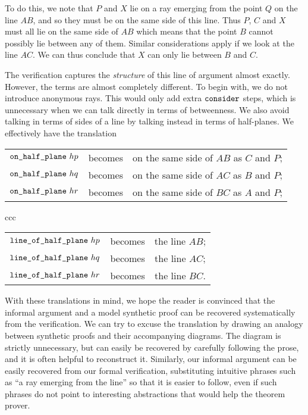 To do this, we note that $P$ and $X$ lie on a ray emerging from the point $Q$ on the line $AB$, and so they must be on the same side of this line. Thus $P$, $C$ and $X$ must all lie on the same side of $AB$ which means that the point $B$ cannot possibly lie between any of them. Similar considerations apply if we look at the line $AC$. We can thus conclude that $X$ can only lie between $B$ and $C$.

The verification captures the \emph{structure} of this line of argument almost exactly. However, the terms are almost completely different. To begin with, we do not introduce anonymous rays. This would only add extra $\texttt{consider}$ steps, which is unnecessary when we can talk directly in terms of betweenness. We also avoid talking in terms of sides of a line by talking instead in terms of half-planes. We effectively have the translation

\label{sec:HalfPlaneTranslations}
\begin{tabular}{ccc}
  $\texttt{on\_half\_plane}\ hp$ & becomes & on the same side of $AB$ as $C$ and $P$;\\
  $\texttt{on\_half\_plane}\ hq$ & becomes & on the same side of $AC$ as $B$ and $P$;\\
  $\texttt{on\_half\_plane}\ hr$ & becomes & on the same side of $BC$ as $A$ and $P$;\\
\end{tabular}{ccc}\linebreak
\begin{tabular}{ccc}
  $\texttt{line\_of\_half\_plane}\ hp$ & becomes & the line $AB$; \\
  $\texttt{line\_of\_half\_plane}\ hq$ & becomes & the line $AC$; \\ 
  $\texttt{line\_of\_half\_plane}\ hr$ & becomes & the line $BC$. \\
\end{tabular}\linebreak

With these translations in mind, we hope the reader is convinced that the informal argument and a model synthetic proof can be recovered systematically from the verification. We can try to excuse the translation by drawing an analogy between synthetic proofs and their accompanying diagrams. The diagram is strictly unnecessary, but can  easily be recovered by carefully following the prose, and it is often helpful to reconstruct it. Similarly, our informal argument can be easily recovered from our formal verification, substituting intuitive phrases such as ``a ray emerging from the line'' so that it is easier to follow, even if such phrases do not point to interesting abstractions that would help the theorem prover.

